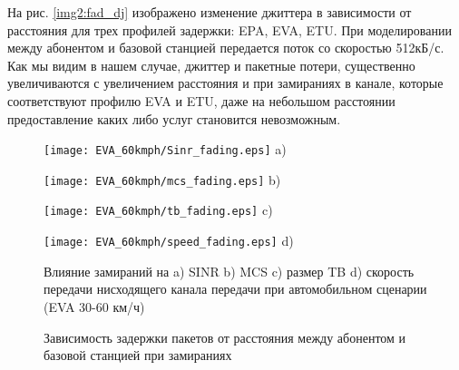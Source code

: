 На рис. \ref{img2:fad_dj} изображено изменение джиттера в зависимости от расстояния для трех профилей задержки: EPA, EVA, ETU. 
При моделировании между абонентом и базовой станцией передается поток со скоростью 512кБ/с. Как мы видим в нашем случае, джиттер и пакетные потери, существенно увеличиваются с увеличением расстояния и при замираниях в канале, которые соответствуют профилю EVA и ETU, даже на небольшом расстоянии предоставление каких либо услуг становится невозможным.

\begin{figure} [!h]
\begin{minipage}[h]{0.47\linewidth}
\center
\texttt{[image: EVA\_60kmph/Sinr\_fading.eps]} a) \\
\end{minipage}
\hfill
\begin{minipage}[h]{0.47\linewidth}
\center
\texttt{[image: EVA\_60kmph/mcs\_fading.eps]} b) \\
\end{minipage}
\vfill
\begin{minipage}[h]{0.47\linewidth}
\center
\texttt{[image: EVA\_60kmph/tb\_fading.eps]} c) \\
\end{minipage}
\hfill
\begin{minipage}[h]{0.47\linewidth}
\center
\texttt{[image: EVA\_60kmph/speed\_fading.eps]} d) \\
\end{minipage}
\caption{Влияние замираний на a) SINR b) MCS c) размер TB d) скорость передачи нисходящего канала передачи при автомобильном сценарии (EVA 30-60 км/ч)}
\label{img:EVA_60kmph}
\end{figure}


\pgfplotsset{width=15cm, height=7cm, compat=1.3}
\begin{figure} [!h]
  \center
{}
\caption{Зависимость задержки пакетов от расстояния между абонентом и базовой станцией при замираниях}
  \label{img2:fad_del}
\end{figure}




